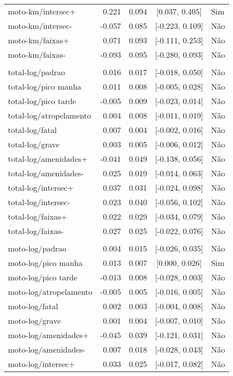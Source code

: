 \begin{longtable}{lrrcl}
moto-km/intersec+ & 0.221 & 0.094 & {}[0.037, 0.405] & Sim\\
moto-km/intersec- & -0.057 & 0.085 & {}[-0.223, 0.109] & Não\\
moto-km/faixas+ & 0.071 & 0.093 & {}[-0.111, 0.253] & Não\\
moto-km/faixas- & -0.093 & 0.095 & {}[-0.280, 0.093] & Não\\
 &  &  &  & \\
total-log/padrao & 0.016 & 0.017 & {}[-0.018, 0.050] & Não\\
total-log/pico manha & 0.011 & 0.008 & {}[-0.005, 0.028] & Não\\
total-log/pico tarde & -0.005 & 0.009 & {}[-0.023, 0.014] & Não\\
total-log/atropelamento & 0.004 & 0.008 & {}[-0.011, 0.019] & Não\\
total-log/fatal & 0.007 & 0.004 & {}[-0.002, 0.016] & Não\\
total-log/grave & 0.003 & 0.005 & {}[-0.006, 0.012] & Não\\
total-log/amenidades+ & -0.041 & 0.049 & {}[-0.138, 0.056] & Não\\
total-log/amenidades- & 0.025 & 0.019 & {}[-0.014, 0.063] & Não\\
total-log/intersec+ & 0.037 & 0.031 & {}[-0.024, 0.098] & Não\\
total-log/intersec- & 0.023 & 0.040 & {}[-0.056, 0.102] & Não\\
total-log/faixas+ & 0.022 & 0.029 & {}[-0.034, 0.079] & Não\\
total-log/faixas- & 0.027 & 0.025 & {}[-0.022, 0.076] & Não\\
 &  &  &  & \\
moto-log/padrao & 0.004 & 0.015 & {}[-0.026, 0.035] & Não\\
moto-log/pico manha & 0.013 & 0.007 & {}[0.000, 0.026] & Sim\\
moto-log/pico tarde & -0.013 & 0.008 & {}[-0.028, 0.003] & Não\\
moto-log/atropelamento & -0.005 & 0.005 & {}[-0.016, 0.005] & Não\\
moto-log/fatal & 0.002 & 0.003 & {}[-0.004, 0.008] & Não\\
moto-log/grave & 0.001 & 0.004 & {}[-0.007, 0.010] & Não\\
moto-log/amenidades+ & -0.045 & 0.039 & {}[-0.121, 0.031] & Não\\
moto-log/amenidades- & 0.007 & 0.018 & {}[-0.028, 0.043] & Não\\
moto-log/intersec+ & 0.033 & 0.025 & {}[-0.017, 0.082] & Não\\

\end{longtable}
